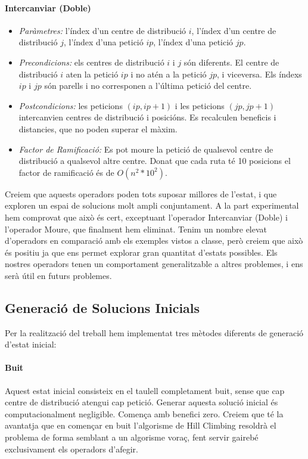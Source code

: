 \documentclass[a4paper]{article}
\begin{document}
\paragraph{Intercanviar (Doble)}
\begin{itemize}
\item \emph{Paràmetres:} l'índex d'un centre de distribució $i$, l'índex d'un centre de distribució $j$, l'índex d'una petició $ip$, l'índex d'una petició $jp$.
\item \emph{Precondicions:} els centres de distribució $i$ i $j$ són diferents. El centre de distribució $i$ aten la petició $ip$ i no atén a la petició $jp$, i viceversa. Els índexs $ip$ i $jp$ són parells i no corresponen a l'última petició del centre.
\item \emph{Postcondicions:} les peticions $(ip, ip+1)$ i les peticions $(jp, jp+1)$ intercanvien centres de distribució i posicións. Es recalculen beneficis i distancies, que no poden superar el màxim.
\item \emph{Factor de Ramificació:} Es pot moure la petició de qualsevol centre de distribució a qualsevol altre centre. Donat que cada ruta té 10 posicions el factor de ramificació és de $O(n^2*10^2)$.\\
\end{itemize}

Creiem que aquests operadors poden tots suposar millores de l'estat, i que exploren un espai de solucions molt ampli conjuntament. A la part experimental hem comprovat que això és cert, exceptuant l'operador Intercanviar (Doble) i l'operador Moure, que finalment hem eliminat. Tenim un nombre elevat d'operadors en comparació amb els exemples vistos a classe, però creiem que això és positiu ja que ens permet explorar gran quantitat d'estats possibles. Els nostres operadors tenen un comportament generalitzable a altres problemes, i ens serà útil en futurs problemes.\\

\subsection{Generació de Solucions Inicials}
Per la realització del treball hem implementat tres mètodes diferents de generació d'estat inicial:

\paragraph{Buit}
Aquest estat inicial consisteix en el taulell completament buit, sense que cap centre de distribució atengui cap petició. Generar aquesta solució inicial és computacionalment negligible. Comença amb benefici zero. Creiem que té la avantatja que en començar en buit l'algorisme de Hill Climbing resoldrà el problema de forma semblant a un algorisme voraç, fent servir gairebé exclusivament els operadors d'afegir.
\end{document}
